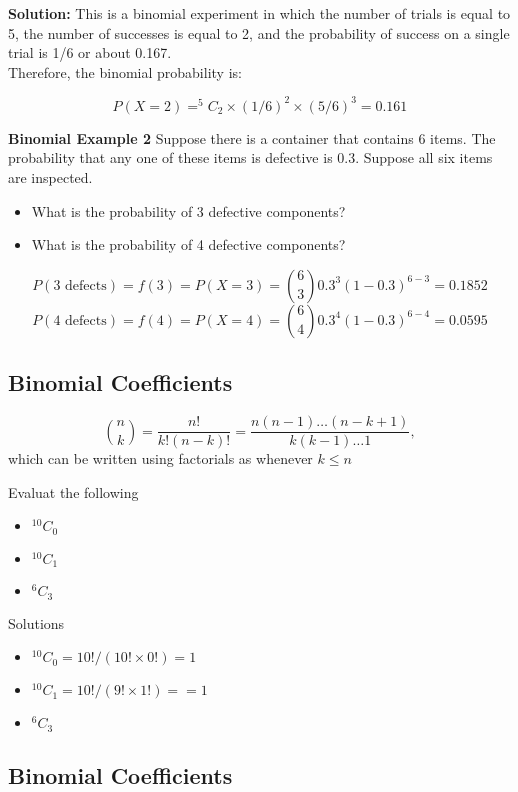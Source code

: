 \documentclass[]{report}
\begin{document}
{{	\textbf{Solution:} This is a binomial experiment in which the number of trials is equal to 5, the number of successes is equal to 2, and the probability of success on a single trial is 1/6 or about 0.167. 
	\\
	\bigskip
	Therefore, the binomial probability is:
	
	\[P(X=2) = ^5C_2 \times (1/6)^2 \times (5/6)^3 = 0.161\]
}

{
	\textbf{ Binomial Example 2 }
	Suppose there is a container that contains 6 items.  The probability that any one of these items is defective is 0.3. Suppose all six items are inspected. 
	\begin{itemize}
		\item What is the probability of 3 defective components?
		\item What is the probability of 4 defective components?
	\end{itemize}
	
	\[ P(3\text{ defects}) = f(3) = P(X = 3) = {6\choose 3}0.3^3 (1-0.3)^{6-3} = 0.1852 \]
	\[ P(4\text{ defects}) = f(4) = P(X = 4) = {6\choose 4}0.3^4 (1-0.3)^{6-4} = 0.0595 \]
}
		

\subsection{Binomial Coefficients}



\[ \binom nk  = \frac{n!}{k!(n-k)!} = \frac{n(n-1)\ldots(n-k+1)}{k(k-1)\dots 1},\]
which can be written using factorials as  whenever $k\leq n$


Evaluat the following
\begin{itemize}
	\item $^{10}C_0$ 
	\item $^{10}C_1$
	\item $^6C_3$
\end{itemize}
Solutions
\begin{itemize}
	\item $^{10}C_0  = 10! / (10! \times 0!) = 1$
	\item $^{10}C_1 =  10! / (9! \times 1!) =  = 1$
	\item $^6C_3$
\end{itemize}



\subsection{Binomial Coefficients}

}
\end{document}
